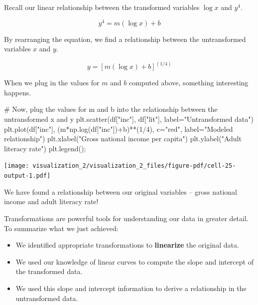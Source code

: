 \documentclass[
  letterpaper,
  DIV=11,
  numbers=noendperiod]{scrreprt}
\newenvironment{Shaded}{\begin{snugshade}}{\end{snugshade}}
\newcommand{\CommentTok}[1]{\textcolor[rgb]{0.37,0.37,0.37}{#1}}
\newcommand{\DecValTok}[1]{\textcolor[rgb]{0.68,0.00,0.00}{#1}}
\newcommand{\NormalTok}[1]{\textcolor[rgb]{0.00,0.23,0.31}{#1}}
\newcommand{\OperatorTok}[1]{\textcolor[rgb]{0.37,0.37,0.37}{#1}}
\newcommand{\StringTok}[1]{\textcolor[rgb]{0.13,0.47,0.30}{#1}}
\providecommand{\tightlist}{%
  \setlength{\itemsep}{0pt}\setlength{\parskip}{0pt}}\usepackage{longtable,booktabs,array}
\begin{document}
Recall our linear relationship between the transformed variables
\(\log{x}\) and \(y^4\).

\[y^4 = m(\log{x}) + b\]

By rearranging the equation, we find a relationship between the
untransformed variables \(x\) and \(y\).

\[y = [m(\log{x}) + b]^{(1/4)}\]

When we plug in the values for \(m\) and \(b\) computed above, something
interesting happens.

\begin{Shaded}
\begin{Highlighting}[]
\CommentTok{\# Now, plug the values for m and b into the relationship between the untransformed x and y}
\NormalTok{plt.scatter(df[}\StringTok{"inc"}\NormalTok{], df[}\StringTok{"lit"}\NormalTok{], label}\OperatorTok{=}\StringTok{"Untransformed data"}\NormalTok{)}
\NormalTok{plt.plot(df[}\StringTok{"inc"}\NormalTok{], (m}\OperatorTok{*}\NormalTok{np.log(df[}\StringTok{"inc"}\NormalTok{])}\OperatorTok{+}\NormalTok{b)}\OperatorTok{**}\NormalTok{(}\DecValTok{1}\OperatorTok{/}\DecValTok{4}\NormalTok{), c}\OperatorTok{=}\StringTok{"red"}\NormalTok{, label}\OperatorTok{=}\StringTok{"Modeled relationship"}\NormalTok{)}
\NormalTok{plt.xlabel(}\StringTok{"Gross national income per capita"}\NormalTok{)}
\NormalTok{plt.ylabel(}\StringTok{"Adult literacy rate"}\NormalTok{)}
\NormalTok{plt.legend()}\OperatorTok{;}
\end{Highlighting}
\end{Shaded}

\texttt{[image: visualization\_2/visualization\_2\_files/figure-pdf/cell-25-output-1.pdf]}

We have found a relationship between our original variables -- gross
national income and adult literacy rate!

Transformations are powerful tools for understanding our data in greater
detail. To summarize what we just achieved:

\begin{itemize}
\tightlist
\item
  We identified appropriate transformations to \textbf{linearize} the
  original data.
\item
  We used our knowledge of linear curves to compute the slope and
  intercept of the transformed data.
\item
  We used this slope and intercept information to derive a relationship
  in the untransformed data.
\end{itemize}
\end{document}

